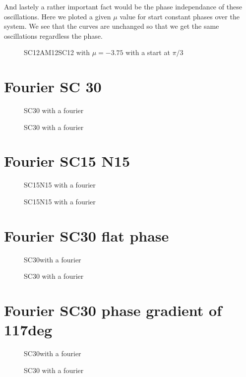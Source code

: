\documentclass[../main.tex]{subfiles}
\begin{document}
And lastely a rather important fact would be the phase independance of these oscillations. Here we ploted a given $\mu$ value for start constant phases over the system. We see that the
curves are unchanged so that we get the same oscillations regardless the phase. 
\begin{figure}[H]
    \centering
    
    \caption{SC12AM12SC12 with $\mu=-3.75$ with a start at $\pi/3$}
\end{figure}

\section{Fourier SC 30}
\begin{figure}[H]
    \centering
    
    \caption{SC30 with a fourier}
\end{figure}
\begin{figure}[H]
    \centering
    
    \caption{SC30 with a fourier}
\end{figure}
\section{Fourier SC15 N15 }
\begin{figure}[H]
    \centering
    
    \caption{SC15N15 with a fourier}
\end{figure}
\begin{figure}[H]
    \centering
    
    \caption{SC15N15 with a fourier}
\end{figure}
\section{Fourier SC30 flat phase}
\begin{figure}[H]
    \centering
    
    \caption{SC30with a fourier}
\end{figure}
\begin{figure}[H]
    \centering
    
    \caption{SC30 with a fourier}
\end{figure}

\section{Fourier SC30 phase gradient of 117deg}
\begin{figure}[H]
    \centering
    
    \caption{SC30with a fourier}
\end{figure}
\begin{figure}[H]
    \centering
    
    \caption{SC30 with a fourier}
\end{figure}
\end{document}
